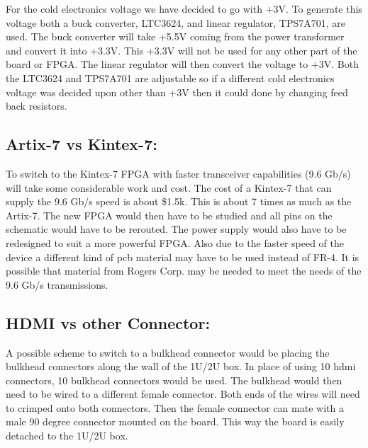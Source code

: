 For the cold electronics voltage we have decided to go with +3V. To generate this voltage both a buck converter, LTC3624, and linear regulator, TPS7A701, are used. The buck converter will take +5.5V coming from the power transformer and convert it into +3.3V. This +3.3V will not be used for any other part of the board or FPGA. The linear regulator will then convert the voltage to +3V. 
Both the LTC3624 and TPS7A701 are adjustable so if a different cold electronics voltage was decided upon other than +3V then it could done by changing feed back resistors. 


\subsection{Artix-7 vs Kintex-7: }

To switch to the Kintex-7 FPGA with faster transceiver capabilities (9.6 Gb/s) will take some considerable work and cost. The cost of a Kintex-7 that can supply the 9.6 Gb/s speed is about \$1.5k. This is about 7 times as much as the Artix-7. The new FPGA would then have to be studied and all pins on the schematic would have to be rerouted. The power supply would also have to be redesigned to suit a more powerful FPGA. Also due to the faster speed of the device a different kind of pcb material may have to be used instead of FR-4. It is possible that material from Rogers Corp. may be needed to meet the needs of the 9.6 Gb/s transmissions. 

\subsection{HDMI vs other Connector: }

A possible scheme to switch to a bulkhead connector would be placing the bulkhead connectors along the wall of the 1U/2U box. In place of using 10 hdmi connectors, 10 bulkhead connectors would be used. The bulkhead would then need to be wired to a different female connector. Both ends of the wires will need to crimped onto both connectors. Then the female connector can mate with a male 90 degree connector mounted on the board. This way the board is easily detached to the 1U/2U box.
